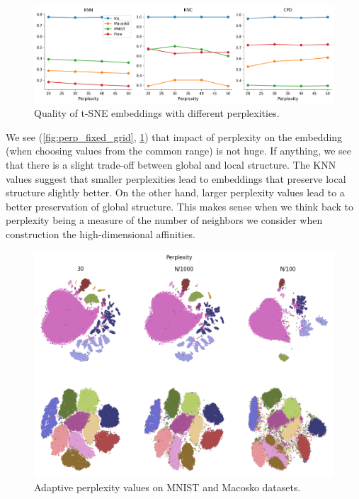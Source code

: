 \begin{figure}[h]
    \centering 
        \includegraphics[width=\linewidth]{../code/figures/perp_fixed_3_quality_measures.png}
        \caption{Quality of t-SNE embeddings with different perplexities.}
    \label{fig:perp_fixed_quality}
\end{figure}
We see (\ref{fig:perp_fixed_grid}, \ref{fig:perp_fixed_quality}) that impact of perplexity on the embedding (when choosing values from the common range) is not huge. 
If anything, we see that there is a slight trade-off between global and local structure. 
The KNN values suggest that smaller perplexities lead to embeddings that preserve local structure slightly better. 
On the other hand, larger perplexity values lead to a better preservation of global structure. 
This makes sense when we think back to perplexity being a measure of the number of neighbors we consider when construction the high-dimensional affinities. 

\begin{figure}[h]
    \centering 
        \includegraphics[width=\linewidth]{../code/figures/perp_adapt_embedding_grid_tab20b.png}
        \caption{Adaptive perplexity values on MNIST and Macosko datasets.}
    \label{fig:perp_adapt_grid}
\end{figure}

